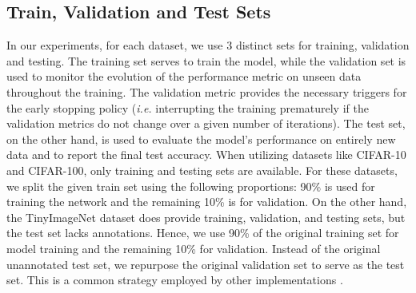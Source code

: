 \subsection{Train, Validation and Test Sets}

In our experiments, for each dataset, we use 3 distinct sets for training,
validation and testing. The training set serves to train the model, while the
validation set is used to monitor the evolution of the performance metric on
unseen data throughout the training. The validation metric provides the
necessary triggers for the early stopping policy (\emph{i.e.} interrupting the
training prematurely if the validation metrics do not change over a given number
of iterations). The test set, on the other hand, is used to evaluate the model's
performance on entirely new data and to report the final test accuracy. When
utilizing datasets like CIFAR-10 and CIFAR-100, only training and testing sets
are available. For these datasets, we split the given train set using the
following proportions: 90\% is used for training the network and the remaining
10\% is for validation. On the other hand, the TinyImageNet dataset does provide
training, validation, and testing sets, but the test set lacks annotations.
Hence, we use 90\% of the original training set for model training and the
remaining 10\% for validation. Instead of the original unannotated test set, we
repurpose the original validation set to serve as the test set. This is a common
strategy employed by other implementations
\cite{hanyuanxu2018tinyimagenet,nbdt,alvinwan2020nbdt}.\\
